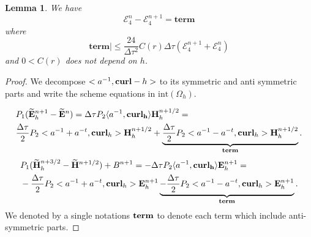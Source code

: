\documentclass[12pt,reqno]{amsart}
\newcommand{\curl}{{\bf curl}}
\newcommand{\acurl}{\langle a^{-1},{\bf curl_h}\rangle}
\newcommand{\e}{{\bf E}}
\newcommand{\h}{{\bf H}}
\newtheorem{lem}[theorem]{Lemma}
\theoremstyle{definition}
\numberwithin{equation}{section}
\newcommand{\intr}[1]{\mathrm{int}(#1)}
\def\Gwh{\Omega_h}
\begin{document}
\begin{lem}\label{lem:sec} 
	We have
	$$\mathcal{E}_4^n-
\mathcal{E}_4^{n+1}=
\mathbf{term}
$$
where 
$$
\mathbf{term}|\leq \frac{24}{\Delta \tau^2}C(r) \Delta \tau(\mathcal{E}_4^{n+1}+\mathcal{E}_4^{n})
$$
and $0<C(r)$ does not depend on $h$.
\end{lem}
\begin{proof}
	
	We decompose $<a^{-1},\curl-h>$ to its symmetric and anti symmetric parts and write the scheme equations in $\intr{\Gwh}$.
	
	\begin{align*}
		&
		P_1(\widetilde{\e}_h^{n+1} -\widetilde{\e}^{n})=
		\Delta \tau P_2 \acurl \h_h^{n+1/2}=\\&
		\frac{\Delta \tau}{2}P_2<a^{-1}+a^{-t},\curl_h>\h_h^{n+1/2}+
			\underbrace{\frac{\Delta \tau}{2}P_2<a^{-1}-a^{-t},\curl_h>\h_h^{n+1/2}}_{{\bf term }}.
	\end{align*}
	\begin{align*}
		&
		P_1(\widetilde{\h}_h^{n+3/2} -\widetilde{\h}^{n+1/2})+B^{n+1}
		=
		-\Delta \tau P_2 \acurl \e_h^{n+1}  =\\&
		-\frac{\Delta \tau}{2}P_2<a^{-1}+a^{-t},\curl_h>\e_h^{n+1}
		\underbrace{	-\frac{\Delta \tau}{2}P_2<a^{-1}-a^{-t},\curl_h>\e_h^{n+1}}_{{\bf term  }}.
	\end{align*}
We denoted by a single notations ${\bf term}$ to denote each term which include anti-symmetric parts.


\end{proof}
\end{document}
